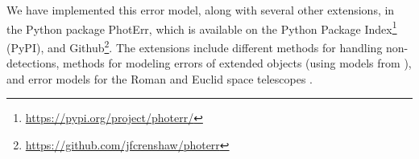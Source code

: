 \documentclass[twocolumn,twocolappendix,linenumbers]{aastex631}
\begin{document}
We have implemented this error model, along with several other extensions, in the Python package PhotErr, which is available on the Python Package Index\footnote{\url{https://pypi.org/project/photerr/}} (PyPI), and Github\footnote{\url{https://github.com/jfcrenshaw/photerr}}.
The extensions include different methods for handling non-detections, methods for modeling errors of extended objects (using models from \citealt{vandenbusch2020,kuijken2019}), and error models for the Roman and Euclid space telescopes \citep{roman,euclid,graham2020}.




\end{document}
